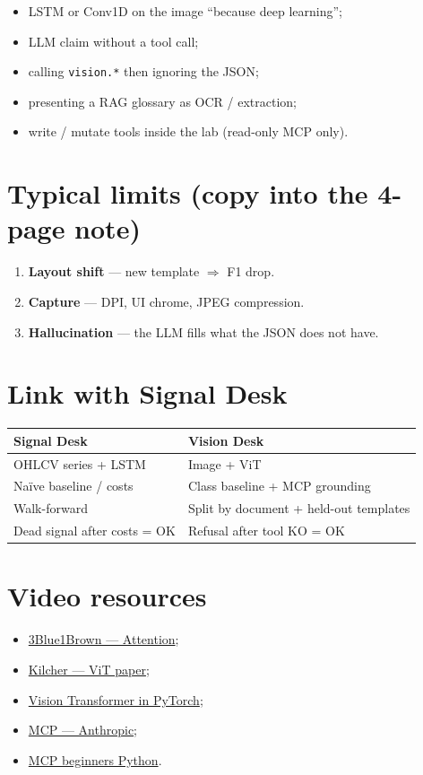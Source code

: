 \documentclass[11pt,a4paper]{article}
\begin{document}
\begin{itemize}
  \item LSTM or Conv1D on the image ``because deep learning'';
  \item LLM claim without a tool call;
  \item calling \texttt{vision.*} then ignoring the JSON;
  \item presenting a RAG glossary as OCR / extraction;
  \item write / mutate tools inside the lab (read-only MCP only).
\end{itemize}

\section{Typical limits (copy into the 4-page note)}

\begin{enumerate}
  \item \textbf{Layout shift} --- new template $\Rightarrow$ F1 drop.
  \item \textbf{Capture} --- DPI, UI chrome, JPEG compression.
  \item \textbf{Hallucination} --- the LLM fills what the JSON does not have.
\end{enumerate}

\section{Link with Signal Desk}

\begin{center}
\renewcommand{\arraystretch}{1.15}
\begin{tabular}{@{}p{5.5cm}p{8.5cm}@{}}
\toprule
\textbf{Signal Desk} & \textbf{Vision Desk} \\
\midrule
OHLCV series + LSTM & Image + ViT \\
Na\"ive baseline / costs & Class baseline + MCP grounding \\
Walk-forward & Split by document + held-out templates \\
Dead signal after costs = OK & Refusal after tool KO = OK \\
\bottomrule
\end{tabular}
\end{center}

\section{Video resources}

\begin{itemize}
  \item \href{https://www.youtube.com/watch?v=eMlx5fFNoYc}{3Blue1Brown --- Attention};
  \item \href{https://www.youtube.com/watch?v=TrdevFK_am4}{Kilcher --- ViT paper};
  \item \href{https://www.youtube.com/watch?v=ovB0ddFtzzA}{Vision Transformer in PyTorch};
  \item \href{https://www.youtube.com/watch?v=CQywdSdi5iA}{MCP --- Anthropic};
  \item \href{https://www.youtube.com/watch?v=LYfr7qusVSs}{MCP beginners Python}.
\end{itemize}
\end{document}
